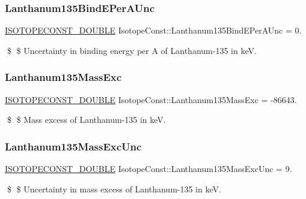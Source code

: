 \subsubsection{\texorpdfstring{Lanthanum135\+Bind\+E\+Per\+A\+Unc}{Lanthanum135BindEPerAUnc}}
{\footnotesize\ttfamily \mbox{\hyperlink{group___isotope_const-_macros_ga8f45a7272ce02c0b4c65c44636ed719a}{I\+S\+O\+T\+O\+P\+E\+C\+O\+N\+S\+T\+\_\+\+D\+O\+U\+B\+LE}} Isotope\+Const\+::\+Lanthanum135\+Bind\+E\+Per\+A\+Unc = 0.}

\$ \$ Uncertainty in binding energy per A of Lanthanum-\/135 in keV. \mbox{\label{group___isotope_const-_lanthanum-_la135_ga69240dda939e1fb1664a5174e4aa983c}} 
\subsubsection{\texorpdfstring{Lanthanum135\+Mass\+Exc}{Lanthanum135MassExc}}
{\footnotesize\ttfamily \mbox{\hyperlink{group___isotope_const-_macros_ga8f45a7272ce02c0b4c65c44636ed719a}{I\+S\+O\+T\+O\+P\+E\+C\+O\+N\+S\+T\+\_\+\+D\+O\+U\+B\+LE}} Isotope\+Const\+::\+Lanthanum135\+Mass\+Exc = -\/86643.}

\$ \$ Mass excess of Lanthanum-\/135 in keV. \mbox{\label{group___isotope_const-_lanthanum-_la135_ga1c834f15e14448dbfd3c2c6b8ec422f9}} 
\subsubsection{\texorpdfstring{Lanthanum135\+Mass\+Exc\+Unc}{Lanthanum135MassExcUnc}}
{\footnotesize\ttfamily \mbox{\hyperlink{group___isotope_const-_macros_ga8f45a7272ce02c0b4c65c44636ed719a}{I\+S\+O\+T\+O\+P\+E\+C\+O\+N\+S\+T\+\_\+\+D\+O\+U\+B\+LE}} Isotope\+Const\+::\+Lanthanum135\+Mass\+Exc\+Unc = 9.}

\$ \$ Uncertainty in mass excess of Lanthanum-\/135 in keV. \mbox{\label{group___isotope_const-_lanthanum-_la135_gac2f3a666d25d2883b18e874ec4f283b6}} 
